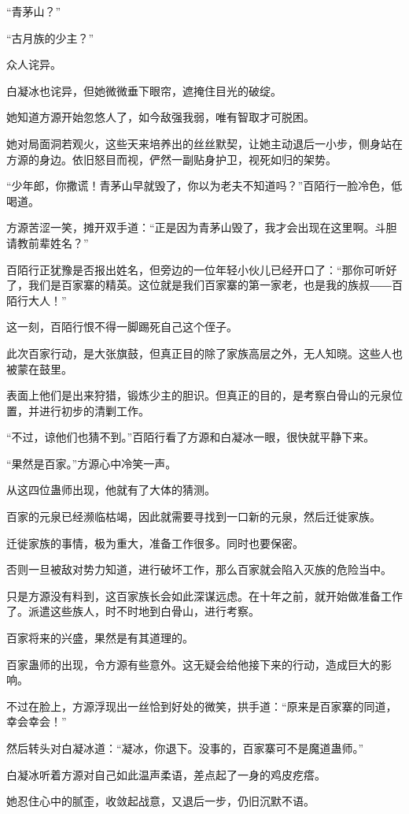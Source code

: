 \begin{this_body}
“青茅山？”

“古月族的少主？”

众人诧异。

白凝冰也诧异，但她微微垂下眼帘，遮掩住目光的破绽。

她知道方源开始忽悠人了，如今敌强我弱，唯有智取才可脱困。

她对局面洞若观火，这些天来培养出的丝丝默契，让她主动退后一小步，侧身站在方源的身边。依旧怒目而视，俨然一副贴身护卫，视死如归的架势。

“少年郎，你撒谎！青茅山早就毁了，你以为老夫不知道吗？”百陌行一脸冷色，低喝道。

方源苦涩一笑，摊开双手道：“正是因为青茅山毁了，我才会出现在这里啊。斗胆请教前辈姓名？”

百陌行正犹豫是否报出姓名，但旁边的一位年轻小伙儿已经开口了：“那你可听好了，我们是百家寨的精英。这位就是我们百家寨的第一家老，也是我的族叔――百陌行大人！”

这一刻，百陌行恨不得一脚踢死自己这个侄子。

此次百家行动，是大张旗鼓，但真正目的除了家族高层之外，无人知晓。这些人也被蒙在鼓里。

表面上他们是出来狩猎，锻炼少主的胆识。但真正的目的，是考察白骨山的元泉位置，并进行初步的清剿工作。

“不过，谅他们也猜不到。”百陌行看了方源和白凝冰一眼，很快就平静下来。

“果然是百家。”方源心中冷笑一声。

从这四位蛊师出现，他就有了大体的猜测。

百家的元泉已经濒临枯竭，因此就需要寻找到一口新的元泉，然后迁徙家族。

迁徙家族的事情，极为重大，准备工作很多。同时也要保密。

否则一旦被敌对势力知道，进行破坏工作，那么百家就会陷入灭族的危险当中。

只是方源没有料到，这百家族长会如此深谋远虑。在十年之前，就开始做准备工作了。派遣这些族人，时不时地到白骨山，进行考察。

百家将来的兴盛，果然是有其道理的。

百家蛊师的出现，令方源有些意外。这无疑会给他接下来的行动，造成巨大的影响。

不过在脸上，方源浮现出一丝恰到好处的微笑，拱手道：“原来是百家寨的同道，幸会幸会！”

然后转头对白凝冰道：“凝冰，你退下。没事的，百家寨可不是魔道蛊师。”

白凝冰听着方源对自己如此温声柔语，差点起了一身的鸡皮疙瘩。

她忍住心中的腻歪，收敛起战意，又退后一步，仍旧沉默不语。


\end{this_body}
